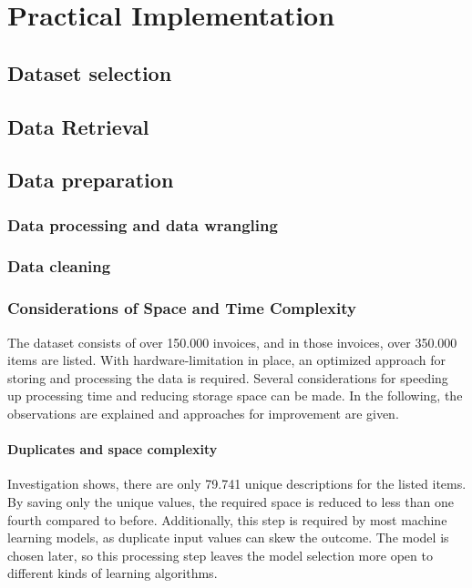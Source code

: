 \chapter{Practical Implementation}

\section{Dataset selection}

\section{Data Retrieval}

\section{Data preparation}

	\subsection{Data processing and data wrangling}
	
	
	\subsection{Data cleaning}
	
	\subsection{Considerations of Space and Time Complexity}
	The dataset consists of over 150.000 invoices, and in those invoices, over 350.000 items are listed. 
	With hardware-limitation in place, an optimized approach for storing and processing the data is required. 
	Several considerations for speeding up processing time and reducing storage space can be made. 
	In the following, the observations are explained and approaches for improvement are given.

		\subsubsection{Duplicates and space complexity}
		Investigation shows, there are only 79.741 unique descriptions for the listed items. By saving only the unique values, the required space is reduced to less than one fourth compared to before. Additionally, this step is required by most machine learning models, as duplicate input values can skew the outcome. The model is chosen later, so this processing step leaves the model selection more open to different kinds of learning algorithms.
		
